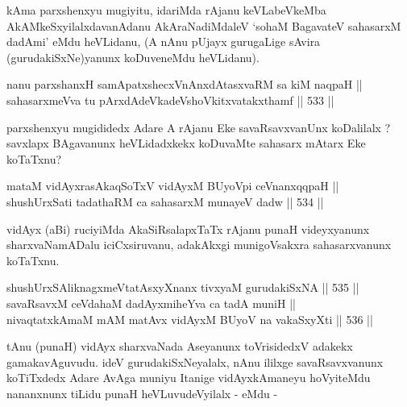 \begin{artha}
kAma parxshenxyu mugiyitu, idariMda rAjanu keVLabeVkeMba
AkAMkeSxyilalxdavanAdanu AkAraNadiMdaleV `so\s haM BagavateV
sahasarxM dadAmi' eMdu heVLidanu, (A nAnu pUjayx gurugaLige sAvira
(gurudakiSxNe)yanunx koDuveneMdu heVLidanu).
\end{artha} 


\begin{shl}
nanu parxshanxH samApatxshecxVnAnxdAtasxvaRM sa kiM naqpaH || \\
sahasarxmeVva tu pArxdAdeVkadeVshoVkitxvatakxthamf \hfill || 533 ||  
\end{shl}

\begin{artha}
parxshenxyu mugididedx Adare A rAjanu Eke savaRsavxvanUnx koDalilalx
? savxlapx BAgavanunx heVLidadxkekx koDuvaMte sahasarx mAtarx Eke
koTaTxnu?
\end{artha}


\begin{shl}
mataM vidAyxrasAkaqSoTxV vidAyxM BUyoV\s pi ceVnanxqqpaH || \\
shushUrxSati tadathaRM ca sahasarxM munayeV dadw \hfill || 534 ||  
\end{shl}

\begin{artha}
vidAyx (aBi) ruciyiMda AkaSiRsalapxTaTx rAjanu punaH videyxyanunx
sharxvaNamADalu iciCxsiruvanu, adakAkxgi munigoVsakxra sahasarxvanunx
koTaTxnu.
\end{artha}


\begin{shl}
shushUrxSAliknagxmeVtatAsxyXnanx tivxyaM gurudakiSxNA \hfill || 535 ||  \\
savaRsavxM ceVdahaM dadAyxmiheYva ca tadA muniH || \\
nivaqtatxkAmaM mAM matAvx vidAyxM BUyoV na vakaSxyXti \hfill || 536 ||  
\end{shl}

\begin{artha}
tAnu (punaH) vidAyx sharxvaNada Aseyanunx toVrisidedxV adakekx
gamakavAguvudu. ideV gurudakiSxNeyalalx, nAnu ililxge savaRsavxvanunx
koTiTxdedx Adare AvAga muniyu Itanige vidAyxkAmaneyu hoVyiteMdu
nananxnunx tiLidu punaH heVLuvudeVyilalx - eMdu -
\end{artha}

